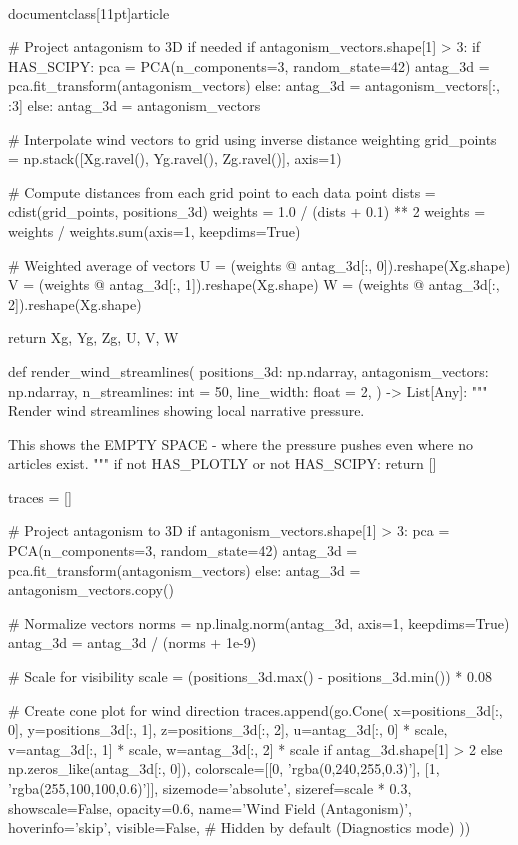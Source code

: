 \\documentclass[11pt]{article}
\begin{document}
\begin{CodeBlock}
{{    # Project antagonism to 3D if needed
    if antagonism_vectors.shape[1] > 3:
        if HAS_SCIPY:
            pca = PCA(n_components=3, random_state=42)
            antag_3d = pca.fit_transform(antagonism_vectors)
        else:
            antag_3d = antagonism_vectors[:, :3]
    else:
        antag_3d = antagonism_vectors

    # Interpolate wind vectors to grid using inverse distance weighting
    grid_points = np.stack([Xg.ravel(), Yg.ravel(), Zg.ravel()], axis=1)

    # Compute distances from each grid point to each data point
    dists = cdist(grid_points, positions_3d)
    weights = 1.0 / (dists + 0.1) ** 2
    weights = weights / weights.sum(axis=1, keepdims=True)

    # Weighted average of vectors
    U = (weights @ antag_3d[:, 0]).reshape(Xg.shape)
    V = (weights @ antag_3d[:, 1]).reshape(Xg.shape)
    W = (weights @ antag_3d[:, 2]).reshape(Xg.shape)

    return Xg, Yg, Zg, U, V, W


def render_wind_streamlines(
    positions_3d: np.ndarray,
    antagonism_vectors: np.ndarray,
    n_streamlines: int = 50,
    line_width: float = 2,
) -> List[Any]:
    """
    Render wind streamlines showing local narrative pressure.

    This shows the EMPTY SPACE - where the pressure pushes even where no articles exist.
    """
    if not HAS_PLOTLY or not HAS_SCIPY:
        return []

    traces = []

    # Project antagonism to 3D
    if antagonism_vectors.shape[1] > 3:
        pca = PCA(n_components=3, random_state=42)
        antag_3d = pca.fit_transform(antagonism_vectors)
    else:
        antag_3d = antagonism_vectors.copy()

    # Normalize vectors
    norms = np.linalg.norm(antag_3d, axis=1, keepdims=True)
    antag_3d = antag_3d / (norms + 1e-9)

    # Scale for visibility
    scale = (positions_3d.max() - positions_3d.min()) * 0.08

    # Create cone plot for wind direction
    traces.append(go.Cone(
        x=positions_3d[:, 0],
        y=positions_3d[:, 1],
        z=positions_3d[:, 2],
        u=antag_3d[:, 0] * scale,
        v=antag_3d[:, 1] * scale,
        w=antag_3d[:, 2] * scale if antag_3d.shape[1] > 2 else np.zeros_like(antag_3d[:, 0]),
        colorscale=[[0, 'rgba(0,240,255,0.3)'], [1, 'rgba(255,100,100,0.6)']],
        sizemode='absolute',
        sizeref=scale * 0.3,
        showscale=False,
        opacity=0.6,
        name='Wind Field (Antagonism)',
        hoverinfo='skip',
        visible=False,  # Hidden by default (Diagnostics mode)
    ))

}}
\end{CodeBlock}
\end{document}
